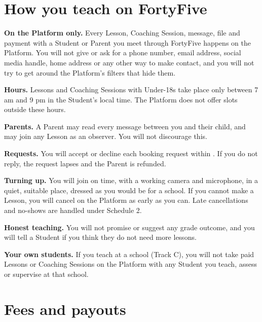 \documentclass[11pt]{article}
\begin{document}
\section{How you teach on FortyFive}

\begin{clauses}
  \item \textbf{On the Platform only.} Every Lesson, Coaching Session, message, file and payment with a Student or Parent you meet through FortyFive happens on the Platform. You will not give or ask for a phone number, email address, social media handle, home address or any other way to make contact, and you will not try to get around the Platform's filters that hide them.
  \item \textbf{Hours.} Lessons and Coaching Sessions with Under-18s take place only between 7 am and 9 pm in the Student's local time. The Platform does not offer slots outside these hours.
  \item \textbf{Parents.} A Parent may read every message between you and their child, and may join any Lesson as an observer. You will not discourage this.
  \item \textbf{Requests.} You will accept or decline each booking request within . If you do not reply, the request lapses and the Parent is refunded.
  \item \textbf{Turning up.} You will join on time, with a working camera and microphone, in a quiet, suitable place, dressed as you would be for a school. If you cannot make a Lesson, you will cancel on the Platform as early as you can. Late cancellations and no-shows are handled under Schedule 2.
  \item \textbf{Honest teaching.} You will not promise or suggest any grade outcome, and you will tell a Student if you think they do not need more lessons.
  \item \textbf{Your own students.} If you teach at a school (Track C), you will not take paid Lessons or Coaching Sessions on the Platform with any Student you teach, assess or supervise at that school.
\end{clauses}

\section{Fees and payouts}
\end{document}
